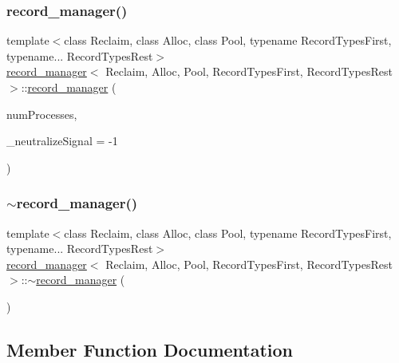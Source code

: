 \subsubsection{\texorpdfstring{record\+\_\+manager()}{record\_manager()}}
{\footnotesize\ttfamily template$<$class Reclaim, class Alloc, class Pool, typename Record\+Types\+First, typename... Record\+Types\+Rest$>$ \\
\hyperlink{classrecord__manager}{record\+\_\+manager}$<$ Reclaim, Alloc, Pool, Record\+Types\+First, Record\+Types\+Rest $>$\+::\hyperlink{classrecord__manager}{record\+\_\+manager} (\begin{DoxyParamCaption}\item[{const int}]{num\+Processes,  }\item[{const int}]{\+\_\+neutralize\+Signal = {\ttfamily -\/1} }\end{DoxyParamCaption})\hspace{0.3cm}{\ttfamily [inline]}}

\mbox{\label{classrecord__manager_a40ef9dfae2ecd2f874b4598b5791fb96}} 
\subsubsection{\texorpdfstring{$\sim$record\+\_\+manager()}{~record\_manager()}}
{\footnotesize\ttfamily template$<$class Reclaim, class Alloc, class Pool, typename Record\+Types\+First, typename... Record\+Types\+Rest$>$ \\
\hyperlink{classrecord__manager}{record\+\_\+manager}$<$ Reclaim, Alloc, Pool, Record\+Types\+First, Record\+Types\+Rest $>$\+::$\sim$\hyperlink{classrecord__manager}{record\+\_\+manager} (\begin{DoxyParamCaption}{ }\end{DoxyParamCaption})\hspace{0.3cm}{\ttfamily [inline]}}



\subsection{Member Function Documentation}
\mbox{\label{classrecord__manager_ae9c214a42d934bcbe4a6fc980dcdace0}} 
